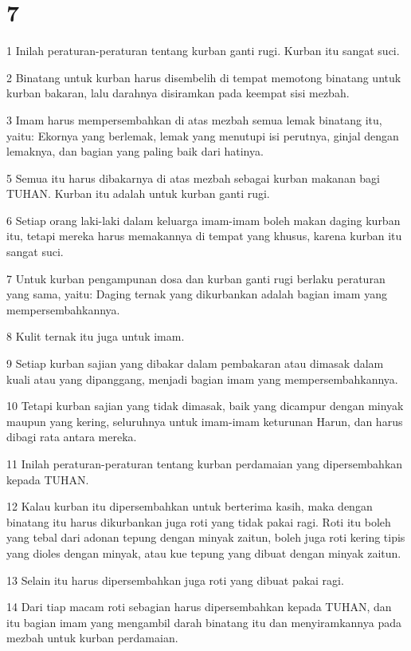\chapter{7}

\par 1 Inilah peraturan-peraturan tentang kurban ganti rugi. Kurban itu sangat suci.
\par 2 Binatang untuk kurban harus disembelih di tempat memotong binatang untuk kurban bakaran, lalu darahnya disiramkan pada keempat sisi mezbah.
\par 3 Imam harus mempersembahkan di atas mezbah semua lemak binatang itu, yaitu: Ekornya yang berlemak, lemak yang menutupi isi perutnya, ginjal dengan lemaknya, dan bagian yang paling baik dari hatinya.
\par 5 Semua itu harus dibakarnya di atas mezbah sebagai kurban makanan bagi TUHAN. Kurban itu adalah untuk kurban ganti rugi.
\par 6 Setiap orang laki-laki dalam keluarga imam-imam boleh makan daging kurban itu, tetapi mereka harus memakannya di tempat yang khusus, karena kurban itu sangat suci.
\par 7 Untuk kurban pengampunan dosa dan kurban ganti rugi berlaku peraturan yang sama, yaitu: Daging ternak yang dikurbankan adalah bagian imam yang mempersembahkannya.
\par 8 Kulit ternak itu juga untuk imam.
\par 9 Setiap kurban sajian yang dibakar dalam pembakaran atau dimasak dalam kuali atau yang dipanggang, menjadi bagian imam yang mempersembahkannya.
\par 10 Tetapi kurban sajian yang tidak dimasak, baik yang dicampur dengan minyak maupun yang kering, seluruhnya untuk imam-imam keturunan Harun, dan harus dibagi rata antara mereka.
\par 11 Inilah peraturan-peraturan tentang kurban perdamaian yang dipersembahkan kepada TUHAN.
\par 12 Kalau kurban itu dipersembahkan untuk berterima kasih, maka dengan binatang itu harus dikurbankan juga roti yang tidak pakai ragi. Roti itu boleh yang tebal dari adonan tepung dengan minyak zaitun, boleh juga roti kering tipis yang dioles dengan minyak, atau kue tepung yang dibuat dengan minyak zaitun.
\par 13 Selain itu harus dipersembahkan juga roti yang dibuat pakai ragi.
\par 14 Dari tiap macam roti sebagian harus dipersembahkan kepada TUHAN, dan itu bagian imam yang mengambil darah binatang itu dan menyiramkannya pada mezbah untuk kurban perdamaian.
